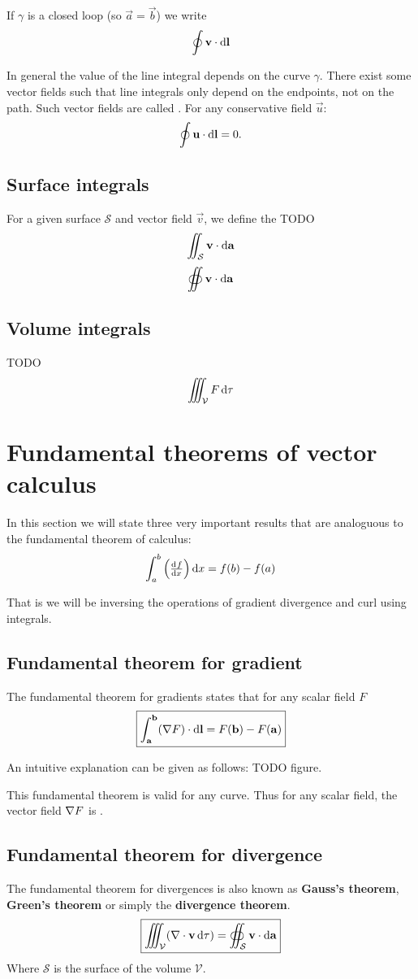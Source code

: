 If $\gamma$ is a closed loop (so $\vec{a} = \vec{b}$) we write
\[ \oint \boldsymbol{\mathrm{v}}\cdot \operatorname{d \!}{\boldsymbol{\mathrm{l}}} \]

In general the value of the line integral depends on the curve $\gamma$. There exist some vector fields such that line integrals only depend on the endpoints, not on the path. Such vector fields are called . For any conservative field $\vec{u}$:
\[ \oint \boldsymbol{\mathrm{u}}\cdot \operatorname{d \!}{\boldsymbol{\mathrm{l}}} = 0. \]

\subsection{Surface integrals}
For a given surface $\mathcal{S}$ and vector field $\vec{v}$, we define the 
TODO
\[ \iint_{\mathcal{S}} \boldsymbol{\mathrm{v}}\cdot \operatorname{d \!}{\boldsymbol{\mathrm{a}}} \]
\[ \oiint \boldsymbol{\mathrm{v}}\cdot \operatorname{d \!}{\boldsymbol{\mathrm{a}}} \]

\subsection{Volume integrals}
TODO
\[ \iiint_{\mathcal{V}} F \operatorname{d \!}{\tau} \]

\section{Fundamental theorems of vector calculus}
In this section we will state three very important results that are analoguous to the fundamental theorem of calculus:
\[ \int_a^b \left(\od{f}{x}\right)\diff{x} = f(b) - f(a) \]

That is we will be inversing the operations of gradient divergence and curl using integrals.

\subsection{Fundamental theorem for gradient}
The fundamental theorem for gradients states that for any scalar field $F$
\[ \boxed{ \int_{\boldsymbol{\mathrm{a}}}^{\boldsymbol{\mathrm{b}}}(\mathop{}\! \nabla F)\cdot \operatorname{d \!}{\boldsymbol{\mathrm{l}}} = F(\boldsymbol{\mathrm{b}}) - F(\boldsymbol{\mathrm{a}})  } \]

An intuitive explanation can be given as follows: TODO figure.

This fundamental theorem is valid for any curve. Thus for any scalar field, the vector field $\mathop{}\! \nabla F$ is .

\subsection{Fundamental theorem for divergence}
The fundamental theorem for divergences is also known as \textbf{Gauss's theorem}, \textbf{Green's theorem} or simply the \textbf{divergence theorem}.
\[ \boxed{ \iiint_{\mathcal{V}}(\nabla\cdot \boldsymbol{\mathrm{v}}\operatorname{d \!}{\tau}) = \oiint_{\mathcal{S}} \boldsymbol{\mathrm{v}}\cdot \operatorname{d \!}{\boldsymbol{\mathrm{a}}} } \]
Where $\mathcal{S}$ is the surface of the volume $\mathcal{V}$.

